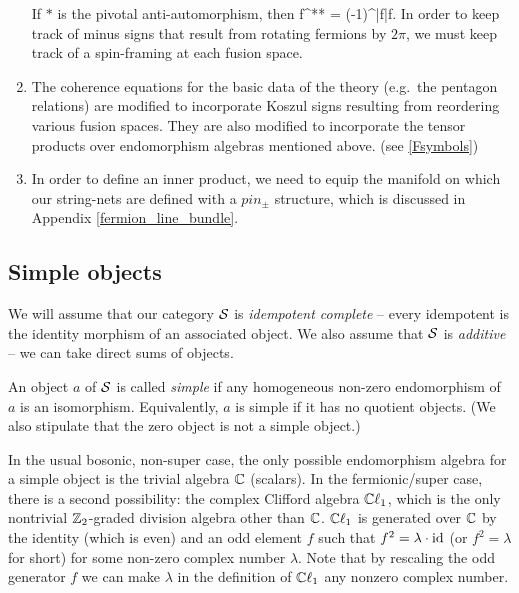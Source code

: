 \begin{enumerate}
	If $*$ is the pivotal anti-automorphism, then 
	\be f^{**} = (-1)^{|f|}f.\ee
	In order to keep track of minus signs that result from rotating fermions by $2\pi$, we must keep track of a spin-framing at each fusion space. 
	\item The coherence equations for the basic data of the theory (e.g.\ the pentagon relations) are modified to incorporate  
	 Koszul signs resulting from reordering various fusion spaces. 
	 They are also modified to incorporate the tensor products over endomorphism algebras mentioned above. (see \ref{Fsymbols})
	\item In order to define an inner product, we need to equip the manifold on which our string-nets are 
	defined with a $pin_\pm$ structure, which is discussed in Appendix \ref{fermion_line_bundle}.
\end{enumerate}





\subsection{Simple objects}  \label{def_sob_ss}

We will assume that our category $\mathcal{S}$ is {\it idempotent complete} -- 
every idempotent is the identity morphism of an associated object.
We also assume that $\mathcal{S}$ is {\it additive} -- we can take direct sums of objects.

An object $a$ of $\mathcal{S}$ is called {\it simple} if any homogeneous non-zero endomorphism of $a$ is an isomorphism.
Equivalently, $a$ is simple if it has no quotient objects.
(We also stipulate that the zero object is not a simple object.)

In the usual bosonic, non-super case, the only possible endomorphism algebra for a simple object
is the trivial algebra $\mathbb{C}$ (scalars).
In the fermionic/super case, there is a second possibility: the complex Clifford algebra $\mathbb{C}\ell_1$, 
which is the only nontrivial $\mathbb{Z}_2$-graded division algebra other than $\mathbb{C}$.
$\mathbb{C}\ell_1$ is generated over $\mathbb{C}$ by the identity (which is even) and an odd element $f$ such that $f^2 = \lambda \cdot \text{id}$
(or $f^2 = \lambda$ for short) for some non-zero complex number $\lambda$. 
Note that by rescaling the odd generator $f$ we can make $\lambda$ in the definition of $\mathbb{C}\ell_1$ any nonzero complex number. 

